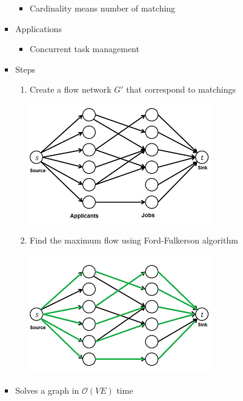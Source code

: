 \documentclass[12pt]{article}
\begin{document}
\begin{enumerate}[1.]
\begin{enumerate}[a)]
\begin{itemize}
\begin{itemize}
                \begin{itemize}
                    \item Cardinality means number of matching
                \end{itemize}
                \item Applications

                \begin{itemize}
                    \item Concurrent task management
                \end{itemize}
                \item Steps

                \begin{enumerate}[1.]
                    \item Create a flow network $G'$ that correspond to matchings

                    \begin{center}
                    \includegraphics[width=0.5\linewidth]{images/worksheet_5_solution_34.png}
                    \end{center}

                    \item Find the maximum flow using Ford-Fulkerson algorithm

                    \begin{center}
                    \includegraphics[width=0.5\linewidth]{images/worksheet_5_solution_35.png}
                    \end{center}
                \end{enumerate}
                \item Solves a graph in $\mathcal{O}(VE)$ time
            \end{itemize}


\end{itemize}
\end{enumerate}
\end{enumerate}
\end{document}
